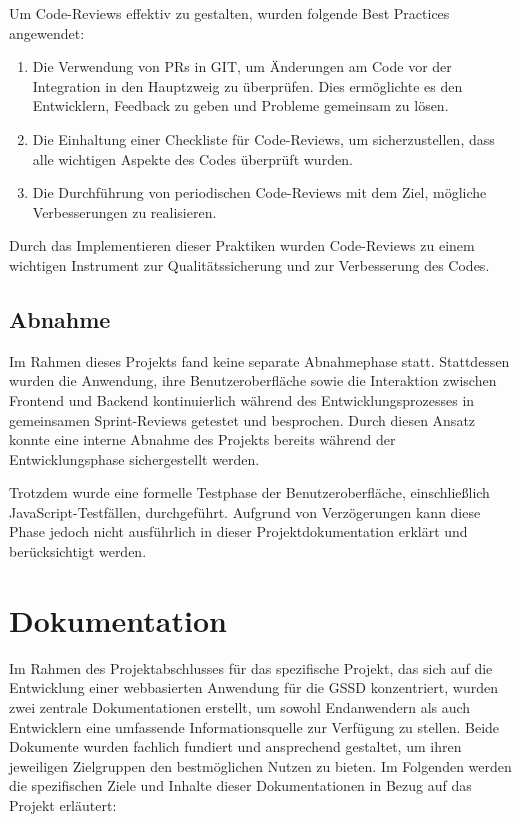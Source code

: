 \begin{flushleft}
			Um Code-Reviews effektiv zu gestalten, wurden folgende Best Practices angewendet:

			\begin{enumerate}
				\item Die Verwendung von \acs{PRs} in \acs{GIT}, um Änderungen am Code vor der Integration in den Hauptzweig zu überprüfen. Dies ermöglichte es den Entwicklern, Feedback zu geben und Probleme gemeinsam zu lösen.
				\item Die Einhaltung einer Checkliste für Code-Reviews, um sicherzustellen, dass alle wichtigen Aspekte des Codes überprüft wurden.
				\item Die Durchführung von periodischen Code-Reviews mit dem Ziel, mögliche Verbesserungen zu realisieren.
			\end{enumerate}

			Durch das Implementieren dieser Praktiken wurden Code-Reviews zu einem wichtigen Instrument zur Qualitätssicherung und zur Verbesserung des Codes.

		\subsection{Abnahme}
			Im Rahmen dieses Projekts fand keine separate Abnahmephase statt. Stattdessen wurden die Anwendung, ihre Benutzeroberfläche sowie die Interaktion zwischen Frontend und Backend kontinuierlich während des Entwicklungsprozesses in gemeinsamen Sprint-Reviews getestet und besprochen. Durch diesen Ansatz konnte eine interne Abnahme des Projekts bereits während der Entwicklungsphase sichergestellt werden.

			Trotzdem wurde eine formelle Testphase der Benutzeroberfläche, einschließlich JavaScript-Testfällen, durchgeführt. Aufgrund von Verzögerungen kann diese Phase jedoch nicht ausführlich in dieser Projektdokumentation erklärt und berücksichtigt werden.


	\section{Dokumentation}
		Im Rahmen des Projektabschlusses für das spezifische Projekt, das sich auf die Entwicklung einer webbasierten Anwendung für die \acs{GSSD} konzentriert, wurden zwei zentrale Dokumentationen erstellt, um sowohl Endanwendern als auch Entwicklern eine umfassende Informationsquelle zur Verfügung zu stellen. Beide Dokumente wurden fachlich fundiert und ansprechend gestaltet, um ihren jeweiligen Zielgruppen den bestmöglichen Nutzen zu bieten. Im Folgenden werden die spezifischen Ziele und Inhalte dieser Dokumentationen in Bezug auf das Projekt erläutert:



\end{flushleft}
